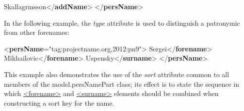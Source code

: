\begin{shaded}
Skallagrmsson{</\textbf{addName}>}\mbox{}\newline 
{</\textbf{persName}>}\end{shaded}\egroup\par \noindent  In the following example, the {\itshape type} attribute is used to distinguish a patronymic from other forenames: \par\bgroup{}\exampleFont \begin{shaded}\noindent\mbox{}{<\textbf{persName}\hspace*{1em}{ref}="{tag:projectname.org,2012:pn9}">}\mbox{}\newline 
{}Sergei{</\textbf{forename}>}\mbox{}\newline 
{}Mikhailovic{</\textbf{forename}>}\mbox{}\newline 
{}Uspensky{</\textbf{surname}>}\mbox{}\newline 
{</\textbf{persName}>}\end{shaded}\egroup\par \par
This example also demonstrates the use of the {\itshape sort} attribute common to all members of the \textsf{model.persNamePart} class; its effect is to state the sequence in which \hyperref[TEI.forename]{<forename>} and \hyperref[TEI.surname]{<surname>} elements should be combined when constructing a sort key for the name.\par

